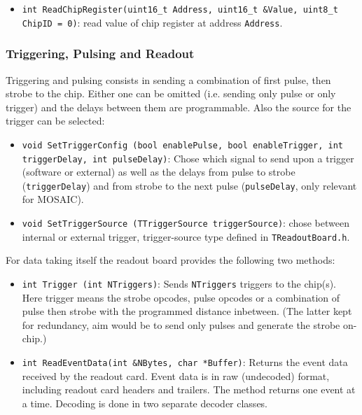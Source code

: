 \documentclass{article}
\begin{document}
\begin{itemize}
\item \texttt{int ReadChipRegister(uint16\_t Address, uint16\_t \&Value, uint8\_t ChipID = 0)}: \newline read value of chip register at address \texttt{Address}.
\end{itemize}


\subsubsection{Triggering, Pulsing and Readout}

Triggering and pulsing consists in sending a combination of first pulse, then strobe to the chip. Either one can be omitted (i.e. sending only pulse or only trigger) and the delays between them are programmable. Also the source for the trigger can be selected: 

\begin{itemize}
\item \texttt{void SetTriggerConfig (bool enablePulse, bool
  enableTrigger, int triggerDelay, int pulseDelay)}: Chose which
signal to send upon a trigger (software or external) as well as the
delays from pulse to strobe (\texttt{triggerDelay}) and from strobe to
the next pulse (\texttt{pulseDelay}, only relevant for MOSAIC).
\item \texttt{void SetTriggerSource (TTriggerSource triggerSource)}:
  chose between internal or external trigger, trigger-source type
  defined in \texttt{TReadoutBoard.h}.
\end{itemize}


For data taking itself the readout board provides the following two methods: 

\begin{itemize}
\item \texttt{int Trigger (int NTriggers)}: Sends \texttt{NTriggers}
  triggers to the chip(s). Here trigger means the strobe opcodes,
  pulse opcodes or a combination of pulse then strobe with the
  programmed distance inbetween. (The latter kept for redundancy,
  aim would be to send only pulses and generate the strobe on-chip.)
\item \texttt{int ReadEventData(int \&NBytes, char *Buffer)}: Returns
  the event data received by the readout card. Event data is in raw
  (undecoded) format, including readout card headers and
  trailers. The method returns one event at a time. Decoding is done in
  two separate decoder classes.\end{itemize}
\end{document}
